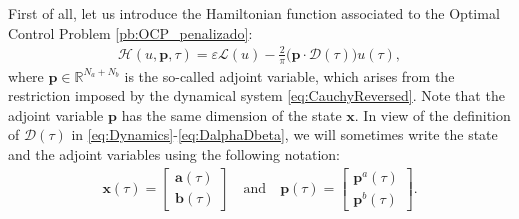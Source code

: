 \documentclass[twocolumn]{autart}    %
\begin{document}
First of all, let us introduce the Hamiltonian function associated to the Optimal Control Problem \ref{pb:OCP_penalizado}:
\begin{align}\label{eq:hamil}
    \mathcal{H}(u,\bm{p},\tau) = \varepsilon \mathcal{L}(u) - \frac 2\pi\big(\bm{p} \cdot \bm{\mathcal{D}}(\tau)\big)u(\tau),
\end{align}
where $\bm{p}\in \mathbb{R}^{N_a+N_b}$ is the so-called adjoint variable,
which arises from the restriction imposed by the dynamical system \eqref{eq:CauchyReversed}. Note that the adjoint variable $\bm{p}$ has the same dimension of the state $\bm{x}$.
In view of the definition of $\bm{\mathcal{D}}(\tau)$ in \eqref{eq:Dynamics}-\eqref{eq:DalphaDbeta}, we will sometimes write the state and the adjoint variables using the following notation:
\begin{gather}
  \bm{x}(\tau) = \begin{bmatrix} \bm{a}(\tau) \\ \bm{b}(\tau) \end{bmatrix} \quad \text{and}\quad
  \bm{p}(\tau) = \begin{bmatrix} \bm{p}^a(\tau) \\ \bm{p}^b(\tau) \end{bmatrix}.
\end{gather}
\end{document}

